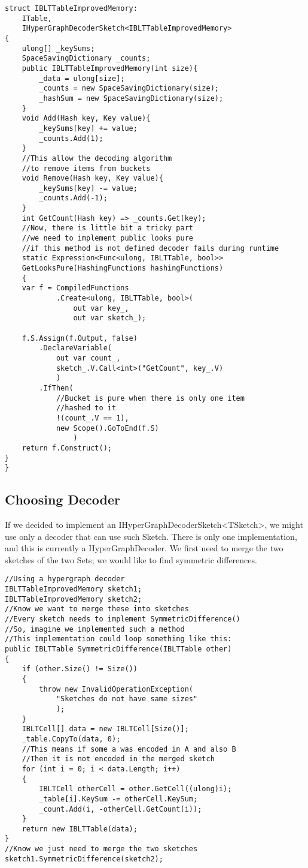 \begin{lstlisting}
struct IBLTTableImprovedMemory: 
    ITable,
    IHyperGraphDecoderSketch<IBLTTableImprovedMemory>
{
    ulong[] _keySums;
    SpaceSavingDictionary _counts;    
    public IBLTTableImprovedMemory(int size){
        _data = ulong[size];
        _counts = new SpaceSavingDictionary(size);
        _hashSum = new SpaceSavingDictionary(size);
    }
    void Add(Hash key, Key value){
        _keySums[key] += value;
        _counts.Add(1);
    }
    //This allow the decoding algorithm 
    //to remove items from buckets
    void Remove(Hash key, Key value){
        _keySums[key] -= value;
        _counts.Add(-1);
    } 
    int GetCount(Hash key) => _counts.Get(key);
    //Now, there is little bit a tricky part
    //we need to implement public looks pure
    //if this method is not defined decoder fails during runtime
    static Expression<Func<ulong, IBLTTable, bool>>
    GetLooksPure(HashingFunctions hashingFunctions)
    {
    var f = CompiledFunctions
            .Create<ulong, IBLTTable, bool>(
                out var key_, 
                out var sketch_);
                
    f.S.Assign(f.Output, false)
        .DeclareVariable(
            out var count_,
            sketch_.V.Call<int>("GetCount", key_.V)
            )
        .IfThen(
            //Bucket is pure when there is only one item 
            //hashed to it
            !(count_.V == 1),
            new Scope().GoToEnd(f.S)
                )
    return f.Construct();
}
}
\end{lstlisting}
\subsection{Choosing Decoder}
If we decided to implement an IHyperGraphDecoderSketch<TSketch>, we might use only a decoder that can use such Sketch. There is only one implementation, and this is currently a HyperGraphDecoder. We first need to merge the two sketches of the two Sets; we would like to find symmetric differences. 
\begin{lstlisting}
//Using a hypergraph decoder
IBLTTableImprovedMemory sketch1;
IBLTTableImprovedMemory sketch2;
//Know we want to merge these into sketches
//Every sketch needs to implement SymmetricDifference()
//So, imagine we implemented such a method
//This implementation could loop something like this:
public IBLTTable SymmetricDifference(IBLTTable other)
{
    if (other.Size() != Size())
    {
        throw new InvalidOperationException(
            "Sketches do not have same sizes"
            );
    }
    IBLTCell[] data = new IBLTCell[Size()];
    _table.CopyTo(data, 0);
    //This means if some a was encoded in A and also B
    //Then it is not encoded in the merged sketch
    for (int i = 0; i < data.Length; i++)
    {
        IBLTCell otherCell = other.GetCell((ulong)i);
        _table[i].KeySum -= otherCell.KeySum;
        _count.Add(i, -otherCell.GetCount(i));
    }
    return new IBLTTable(data);
}
//Know we just need to merge the two sketches
sketch1.SymmetricDifference(sketch2);
\end{lstlisting}

